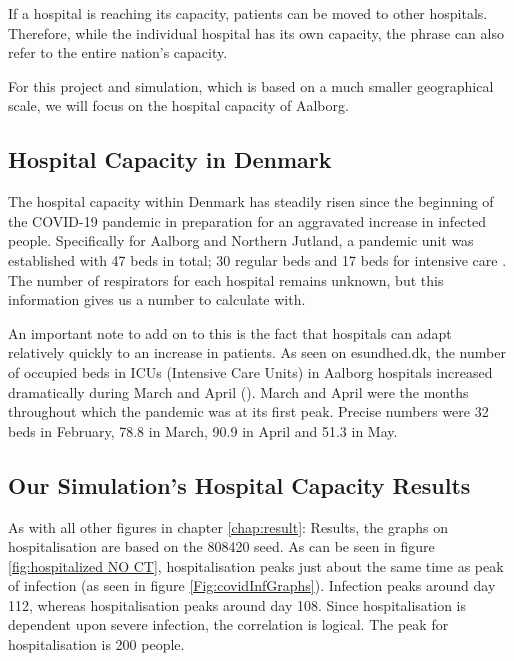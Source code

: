 If a hospital is reaching its capacity, patients can be moved to other hospitals. Therefore, while the individual hospital has its own capacity, the phrase  can also refer to the entire nation's capacity.

For this project and simulation, which is based on a much smaller geographical scale, we will focus on the hospital capacity of Aalborg.

\subsection{Hospital Capacity in Denmark}

The hospital capacity within Denmark has steadily risen since the beginning of the COVID-19 pandemic in preparation for an aggravated increase in infected people. Specifically for Aalborg and Northern Jutland, a pandemic unit was established with 47 beds in total; 30 regular beds and 17 beds for intensive care \citep{dansk_sygeplejerad_fra_2020}. The number of respirators for each hospital remains unknown, but this information gives us a number to calculate with.

An important note to add on to this is the fact that hospitals can adapt relatively quickly to an increase in patients. As seen on esundhed.dk, the number of occupied beds in ICUs (Intensive Care Units) in Aalborg hospitals increased dramatically during March and April (\cite{esundheddk_sengepladser_2020}). March and April were the months throughout which the pandemic was at its first peak. Precise numbers were 32 beds in February, 78.8 in March, 90.9 in April and 51.3 in May. 

 

\subsection{Our Simulation's Hospital Capacity Results}

As with all other figures in chapter \ref{chap:result}: Results, the graphs on hospitalisation are based on the 808420 seed. As can be seen in figure \vref{fig:hospitalized NO CT}, hospitalisation peaks just about the same time as peak of infection (as seen in figure \vref{Fig:covidInfGraphs}). Infection peaks around day 112, whereas hospitalisation peaks around day 108. Since hospitalisation is dependent upon severe infection, the correlation is logical. The peak for hospitalisation is 200 people.

